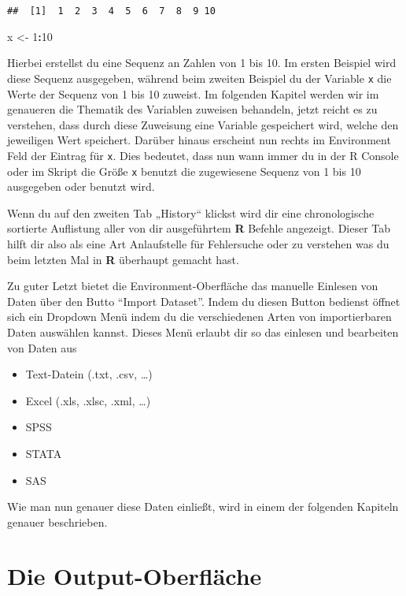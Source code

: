 \documentclass[
]{book}
\newenvironment{Shaded}{\begin{snugshade}}{\end{snugshade}}
\newcommand{\DecValTok}[1]{\textcolor[rgb]{0.00,0.00,0.81}{#1}}
\newcommand{\NormalTok}[1]{#1}
\newcommand{\OperatorTok}[1]{\textcolor[rgb]{0.81,0.36,0.00}{\textbf{#1}}}
\newcommand{\StringTok}[1]{\textcolor[rgb]{0.31,0.60,0.02}{#1}}
\providecommand{\tightlist}{%
  \setlength{\itemsep}{0pt}\setlength{\parskip}{0pt}}
\begin{document}
\begin{verbatim}
##  [1]  1  2  3  4  5  6  7  8  9 10
\end{verbatim}

\begin{Shaded}
\begin{Highlighting}[]
\NormalTok{x <-}\StringTok{ }\DecValTok{1}\OperatorTok{:}\DecValTok{10}
\end{Highlighting}
\end{Shaded}

Hierbei erstellst du eine Sequenz an Zahlen von 1 bis 10. Im ersten Beispiel wird diese Sequenz ausgegeben, während beim zweiten Beispiel du der Variable \texttt{x} die Werte der Sequenz von 1 bis 10 zuweist. Im folgenden Kapitel werden wir im genaueren die Thematik des Variablen zuweisen behandeln, jetzt reicht es zu verstehen, dass durch diese Zuweisung eine Variable gespeichert wird, welche den jeweiligen Wert speichert. Darüber hinaus erscheint nun rechts im Environment Feld der Eintrag für \texttt{x}. Dies bedeutet, dass nun wann immer du in der R Console oder im Skript die Größe \texttt{x} benutzt die zugewiesene Sequenz von 1 bis 10 ausgegeben oder benutzt wird.

Wenn du auf den zweiten Tab „History`` klickst wird dir eine chronologische sortierte Auflistung aller von dir ausgeführtem \textbf{R} Befehle angezeigt. Dieser Tab hilft dir also als eine Art Anlaufstelle für Fehlersuche oder zu verstehen was du beim letzten Mal in \textbf{R} überhaupt gemacht hast.

Zu guter Letzt bietet die Environment-Oberfläche das manuelle Einlesen von Daten über den Butto ``Import Dataset''. Indem du diesen Button bedienst öffnet sich ein Dropdown Menü indem du die verschiedenen Arten von importierbaren Daten auswählen kannst. Dieses Menü erlaubt dir so das einlesen und bearbeiten von Daten aus

\begin{itemize}
\tightlist
\item
  Text-Datein (.txt, .csv, \ldots)
\item
  Excel (.xls, .xlsc, .xml, \ldots)
\item
  SPSS
\item
  STATA
\item
  SAS
\end{itemize}

Wie man nun genauer diese Daten einließt, wird in einem der folgenden Kapiteln genauer beschrieben.

\hypertarget{die-output-oberfluxe4che}{%
\section{Die Output-Oberfläche}\label{die-output-oberfluxe4che}}
\end{document}

